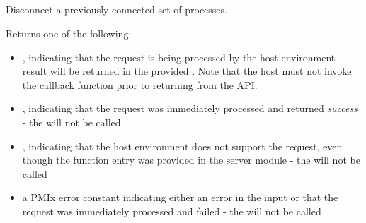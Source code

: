 \subsection{}

\summary

Disconnect a previously connected set of processes.

\format


\begin{arglist}
\end{arglist}

Returns one of the following:

\begin{itemize}
    \item {}, indicating that the request is being processed by the host environment - result will be returned in the provided . Note that the host must not invoke the callback function prior to returning from the \ac{API}.
    \item {}, indicating that the request was immediately processed and returned \textit{success} - the  will not be called
    \item {}, indicating that the host environment does not support the request, even though the function entry was provided in the server module - the  will not be called
    \item a PMIx error constant indicating either an error in the input or that the request was immediately processed and failed - the  will not be called
\end{itemize}

